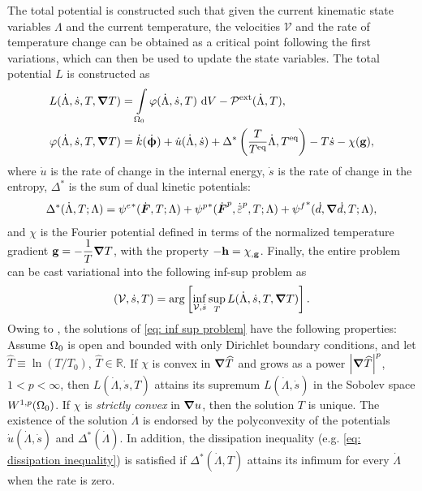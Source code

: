 The total potential is constructed such that given the current kinematic state variables $\Lambda$ and the current temperature, the velocities $\mathcal{V}$ and the rate of temperature change can be obtained as a critical point following the first variations, which can then be used to update the state variables. The total potential $L$ is constructed as
\begin{subequations}
  \begin{align}
    L(\dot{\Lambda}, \dot{s}, T, \boldsymbol{\nabla} T)       & = \int\limits_{\Omega_0} \varphi(\dot{\Lambda}, \dot{s}, T) \text{ d}V - \mathcal{P}^\text{ext}(\dot{\Lambda}, T), \label{eq: total potential 1}                                             \\
    \varphi(\dot{\Lambda}, \dot{s}, T, \boldsymbol{\nabla} T) & = \dot{k}(\dot{\boldsymbol{\upphi}}) + \dot{u}(\dot{\Lambda}, \dot{s}) + \Delta^*\left( \dfrac{T}{T^\text{eq}}\dot{\Lambda}, T^\text{eq} \right) - T\dot{s} - \chi(\textbf{g}), \label{eq: local energy density} 
  \end{align}
\end{subequations}
where $\dot{u}$ is the rate of change in the internal energy, $\dot{s}$ is the rate of change in the entropy, $\Delta^*$ is the sum of dual kinetic potentials:
\begin{align}
  \Delta^*(\dot{\Lambda}, T; \Lambda) = {\psi^e}^*(\dot{\defgrad}, T; \Lambda) + {\psi^p}^*(\dot{\defgrad}^p, \epdot, T; \Lambda) + {\psi^f}^*(\dot{d}, \grad \dot{d}, T; \Lambda), \label{eq: dual kinetic potentials}
\end{align}
and $\chi$ is the Fourier potential defined in terms of  the normalized temperature gradient $\textbf{g} = -\dfrac{1}{T}\boldsymbol{\nabla} T$, with the property $-\textbf{h} = \chi_{,\textbf{g}}$.
Finally, the entire problem can be cast variational into the following inf-sup problem as
\begin{align}
  \left( \mathcal{V}, \dot{s}, T \right) = \arg \left[ \inf_{\mathcal{V}, \dot{s}} \sup_T L(\dot{\Lambda}, \dot{s}, T, \boldsymbol{\nabla} T) \right]. \label{eq: inf sup problem}
\end{align}
Owing to \cite{dal2012introduction,yang2006variational}, the solutions of \eqref{eq: inf sup problem} have the following properties: Assume $\Omega_0$ is open and bounded with only Dirichlet boundary conditions, and let $\widehat{T} \equiv \ln(T/T_0)$, $\widehat{T} \in \mathbb{R}$.
If $\chi$ is convex in $\boldsymbol{\nabla} \widehat{T}$ and grows as a power $\left\vert{\boldsymbol{\nabla}\widehat{T}}\right\vert^p$, $1 < p < \infty$, then $L(\dot{\Lambda}, \dot{s}, T)$ attains its supremum $L(\dot{\Lambda}, \dot{s})$ in the Sobolev space $W^{1,p}(\Omega_0)$.
If $\chi$ is \emph{strictly convex} in $\boldsymbol{\nabla} u$, then the solution $T$ is unique. The existence of the solution $\dot{\Lambda}$ is endorsed by the polyconvexity of the potentials $\dot{u}(\dot{\Lambda}, \dot{s})$ and $\Delta^*(\dot{\Lambda})$.
In addition, the dissipation inequality (e.g. \eqref{eq: dissipation inequality}) is satisfied if $\Delta^*(\dot{\Lambda}, T)$ attains its infimum for every $\dot{\Lambda}$ when the rate is zero.

